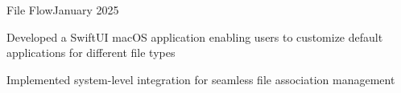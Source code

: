 \begin{resume_subsection}{File Flow}{January 2025}
    \begin{subitems}
        \item Developed a SwiftUI macOS application enabling users to customize default applications for different file types
        \item Implemented system-level integration for seamless file association management
    \end{subitems}
\end{resume_subsection}

